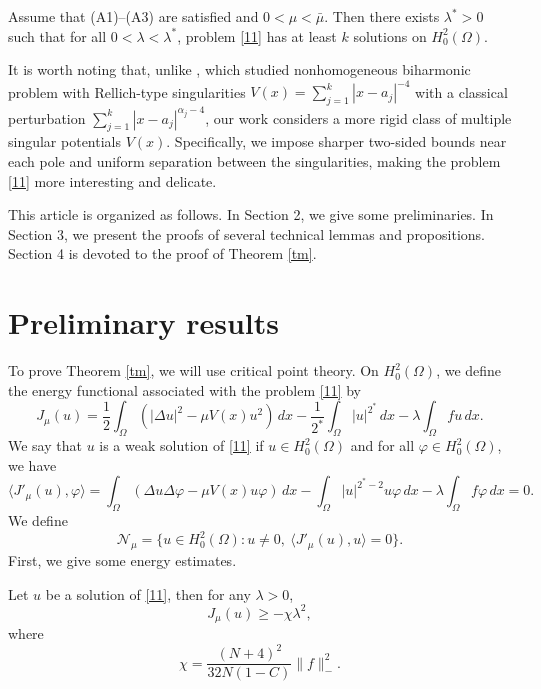 \documentclass[reqno]{amsart}
\begin{document}
 \begin{theorem}\label{tm}
Assume that {\rm (A1)--(A3)} are satisfied and \(0<\mu<\bar{\mu}\).
Then there exists \(\lambda ^*> 0\) such that for all \(0<\lambda <\lambda^*\),
problem \eqref{11} has at least \(k\) solutions on \(H^2_0(\Omega)\).
\end{theorem}

\begin{remark} \rm
It is worth noting that, unlike \cite{ms}, which studied nonhomogeneous biharmonic
problem with Rellich-type singularities \(V(x)= \sum_{j=1}^{k} |x-a_j|^{-4}\) with
a classical perturbation \(\sum_{j=1}^{k} |x-a_j|^{\alpha_j-4}\), our work considers
a more rigid class of multiple singular potentials \(V(x)\).
Specifically, we impose sharper two-sided bounds near each pole and uniform separation
between the singularities, making the problem \eqref{11} more interesting and delicate.
\end{remark}

This article is organized as follows. In Section 2, we give some preliminaries.
In Section 3, we present the proofs of several technical lemmas and propositions.
Section 4 is devoted to the proof of Theorem \ref{tm}.

\section{Preliminary results}

To prove Theorem \ref{tm}, we will use critical point theory.
On \(H^2_0(\Omega)\), we define the energy functional associated with the problem
\eqref{11} by
\[
 J_\mu (u)=\frac{1}{2}\int_{\Omega}(|\Delta u|^2-\mu V(x)u^2)\,dx
 -\frac{1}{2^*} \int_{\Omega} |u|^{2^*}\,dx-\lambda \int_{\Omega} fu\,dx.
\]
We say that \(u\) is a weak solution of \eqref{11} if \(u\in H^2_0(\Omega)\) and for
all \( \varphi \in H^2_0(\Omega)\), we have
\[
\langle J'_\mu (u), \varphi\rangle=\int_{\Omega}
 (\Delta u\Delta \varphi-\mu V(x)u\varphi)\,dx- \int_{\Omega} |u|^{2^*-2}u\varphi\,dx
-\lambda \int_{\Omega} f \varphi\,dx=0.
\]
We define
\[
 \mathcal{N}_\mu=\{ u \in H^2_0(\Omega): u\neq 0, \ \langle J'_\mu (u),
 u\rangle=0 \}.
\]
First, we give some energy estimates.

\begin{lemma}\label{lm}
 Let $u$ be a solution of \eqref{11}, then for any $\lambda>0$,
$$
 J_{\mu}(u)\geq -\chi \lambda^2,
$$
where
$$
\chi =\frac{(N+4)^2}{32N(1-C)}\|f\|_-^2.
$$
 \end{lemma}
\end{document}
